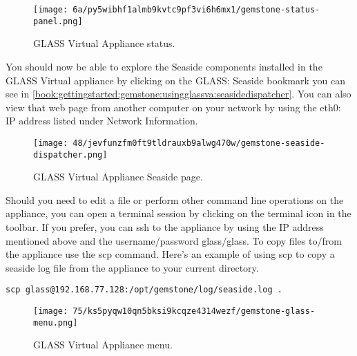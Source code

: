 \documentclass[a4paper,10pt,twoside]{book}
\newcommand{\ct}[1]{{\small\ttfamily\textup{#1}}}
\begin{document}
\begin{figure}[h!tbp]
	\begin{center}
		\texttt{[image: 6a/py5wibhf1almb9kvtc9pf3vi6h6mx1/gemstone-status-panel.png]}
		\caption{GLASS Virtual Appliance status.\label{book:gettingstarted:gemstone:usingglassva:statuspanel}}
	\end{center}
\end{figure}


You should now be able to explore the Seaside components installed in the GLASS Virtual appliance by clicking on the GLASS:  Seaside bookmark you can see in \autoref{book:gettingstarted:gemstone:usingglassva:seasidedispatcher}. You can also view that web page from another computer on your network by using the eth0: IP address listed under Network Information.

\begin{figure}[h!tbp]
	\begin{center}
		\texttt{[image: 48/jevfunzfm0ft9tldrauxb9alwg470w/gemstone-seaside-dispatcher.png]}
		\caption{GLASS Virtual Appliance Seaside page.\label{book:gettingstarted:gemstone:usingglassva:seasidedispatcher}}
	\end{center}
\end{figure}


Should you need to edit a file or perform other command line operations on the appliance, you can open a terminal session by clicking on the terminal icon in the toolbar. If you prefer, you can \ct{ssh} to the appliance by using the IP address mentioned above and the username$/$password glass$/$glass. To copy files to$/$from the appliance use the \ct{scp} command. Here's an example of using \ct{scp} to copy a seaside log file from the appliance to your current directory.

\begin{lstlisting}
scp glass@192.168.77.128:/opt/gemstone/log/seaside.log .
\end{lstlisting}

\begin{figure}[h!tbp]
	\begin{center}
		\texttt{[image: 75/ks5pyqw10qn5bksi9kcqze4314wezf/gemstone-glass-menu.png]}
		\caption{GLASS Virtual Appliance menu.\label{book:gettingstarted:gemstone:usingglassva:glassmenu}}
	\end{center}
\end{figure}
\end{document}
